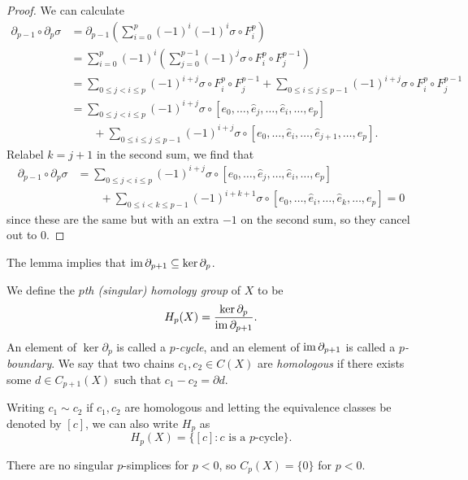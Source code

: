 \begin{proof}
  We can calculate
  \begin{align*}
    \partial_{p - 1} \circ \partial_p \sigma
    &= \partial_{p - 1} \left( \sum_{i = 0}^p (-1)^i (-1)^i \sigma \circ F_i^p \right) \\
    &= \sum_{i = 0}^p (-1)^i \left( \sum_{j = 0}^{p - 1} (-1)^j \sigma \circ F_i^p \circ F_j^{p - 1} \right) \\
    &= \sum_{0 \le j < i \le p} (-1)^{i + j} \sigma \circ F_i^p \circ F_j^{p - 1}
    + \sum_{0 \le i \le j \le p - 1} (-1)^{i + j} \sigma \circ F_i^p \circ F_j^{p - 1} \\
    &= \sum_{0 \le j < i \le p} (-1)^{i + j} \sigma \circ [e_0, \dots, \widehat{e}_j, \dots, \widehat{e}_i, \dots, e_p] \\
    &\quad \quad+ \sum_{0 \le i \le j \le p - 1} (-1)^{i + j} \sigma \circ [e_0, \dots, \widehat{e}_i, \dots, \widehat{e}_{j + 1}, \dots, e_p].
  \end{align*}
  Relabel $k = j + 1$ in the second sum, we find that
  \begin{align*}
    \partial_{p - 1} \circ \partial_p \sigma
    &= \sum_{0 \le j < i \le p} (-1)^{i + j} \sigma \circ [e_0, \dots, \widehat{e}_j, \dots, \widehat{e}_i, \dots, e_p] \\
    &\quad \quad + \sum_{0 \le i < k \le p - 1} (-1)^{i + k + 1} \sigma \circ [e_0, \dots, \widehat{e}_i, \dots, \widehat{e}_{k}, \dots, e_p] = 0
  \end{align*}
  since these are the same but with an extra $-1$ on
  the second sum, so they cancel out to $0$.
\end{proof}

\begin{remark}
  The lemma implies that $\operatorname{im} \partial_{p + 1} \subseteq \ker \partial_p$.
\end{remark}

\begin{definition}
  We define the \emph{$p$th (singular) homology group} of $X$ to be
  \[
    H_p(X) = \frac{\ker \partial_p}{\operatorname{im} \partial_{p + 1}}.
  \]
  An element of $\ker \partial_p$ is called a
  \emph{$p$-cycle}, and an element of $\operatorname{im} \partial_{p + 1}$
  is called a \emph{$p$-boundary}. We say that
  two chains $c_1, c_2 \in C(X)$ are \emph{homologous}
  if there exists some $d \in C_{p + 1}(X)$ such that
  $c_1 - c_2 = \partial d$.

\end{definition}

\begin{remark}
  Writing $c_1 \sim c_2$ if $c_1, c_2$ are homologous
  and
  letting the equivalence classes be denoted
  by $[c]$,
  we can also write $H_p$ as
  \[
    H_p(X) = \{[c] : \text{$c$ is a $p$-cycle}\}.
  \]
\end{remark}

\begin{remark}
  There are no singular $p$-simplices for $p < 0$,
  so $C_p(X) = \{0\}$ for $p < 0$.
\end{remark}

